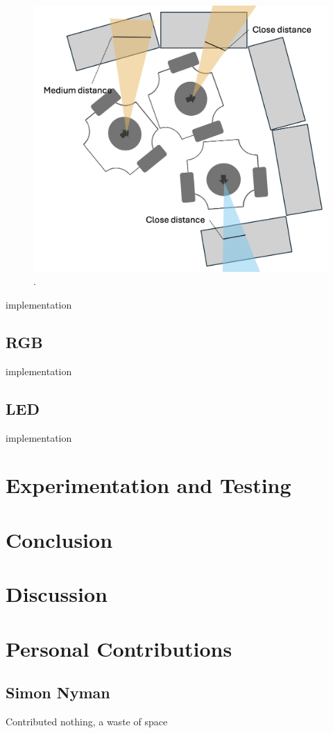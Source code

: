 \documentclass[conference]{IEEEtran}
\begin{document}
\begin{figure}[htbp]
    \centerline{\includegraphics[width=0.9\columnwidth]{Close Distance Avoidance.png}}
    \caption{.}
    \label{sec:close aviodance}
    \end{figure}
implementation
\subsection{RGB}
implementation
\subsection{LED}
implementation
\section{Experimentation and Testing}

\section{Conclusion}

\section{Discussion}

\section{Personal Contributions}

\subsection{Simon Nyman}
Contributed nothing, a waste of space
\end{document}
